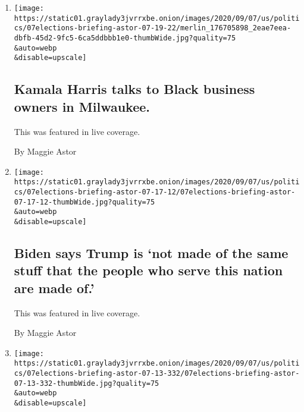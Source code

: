 \begin{enumerate}
\def\labelenumi{\arabic{enumi}.}
\item
  \href{/live/2020/09/07/us/trump-vs-biden/kamala-harris-talks-to-black-business-owners-in-milwaukee}{}

  \texttt{[image: https://static01.graylady3jvrrxbe.onion/images/2020/09/07/us/politics/07elections-briefing-astor-07-19-22/merlin\_176705898\_2eae7eea-dbfb-45d2-9fc5-6ca5ddbbb1e0-thumbWide.jpg?quality=75\\\&auto=webp\\\&disable=upscale]}

  \hypertarget{kamala-harris-talks-to-black-business-owners-in-milwaukee}{%
  \subsection{Kamala Harris talks to Black business owners in
  Milwaukee.}\label{kamala-harris-talks-to-black-business-owners-in-milwaukee}}

  This was featured in live coverage.

  By Maggie Astor
\item
  \href{/live/2020/09/07/us/trump-vs-biden/biden-says-trump-is-not-made-of-the-same-stuff-that-the-people-who-serve-this-nation-are-made-of}{}

  \texttt{[image: https://static01.graylady3jvrrxbe.onion/images/2020/09/07/us/politics/07elections-briefing-astor-07-17-12/07elections-briefing-astor-07-17-12-thumbWide.jpg?quality=75\\\&auto=webp\\\&disable=upscale]}

  \hypertarget{biden-says-trump-is-not-made-of-the-same-stuff-that-the-people-who-serve-this-nation-are-made-of}{%
  \subsection{Biden says Trump is `not made of the same stuff that the
  people who serve this nation are made
  of.'}\label{biden-says-trump-is-not-made-of-the-same-stuff-that-the-people-who-serve-this-nation-are-made-of}}

  This was featured in live coverage.

  By Maggie Astor
\item
  \href{/live/2020/09/07/us/trump-vs-biden/biden-meets-with-union-workers-in-lancaster-pa}{}

  \texttt{[image: https://static01.graylady3jvrrxbe.onion/images/2020/09/07/us/politics/07elections-briefing-astor-07-13-332/07elections-briefing-astor-07-13-332-thumbWide.jpg?quality=75\\\&auto=webp\\\&disable=upscale]}


\end{enumerate}
